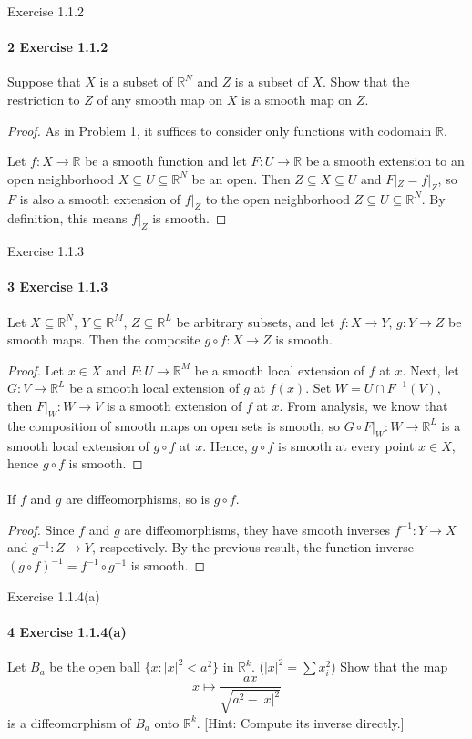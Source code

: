\documentclass[12pt]{article}
\newlength{\myparskip}
\newenvironment{fullbox}{\begin{lrbox}{\savefullbox}\begin{minipage}{\dimexpr\textwidth-2\fboxsep\relax}\setlength{\parskip}{\myparskip}}{\end{minipage}\end{lrbox}\framebox[\textwidth]{\usebox{\savefullbox}}}
\newenvironment{pbox}[1][]{\begin{fullbox}\ifx#1\empty\else\paragraph{#1}\phantom{}\fi}{\end{fullbox}}
\theoremstyle{definition}
\newcommand{\R}{\mathbb{R}}
\newcommand{\<}{\langle}
\renewcommand{\>}{\rangle}
\newcommand{\seq}{\subseteq}
\begin{document}
\newpage
\begin{pbox}[2 Exercise 1.1.2]
    Suppose that $X$ is a subset of $\R^N$ and $Z$ is a subset of $X$.
    Show that the restriction to $Z$ of any smooth map on $X$ is a smooth map on $Z$.
\end{pbox}

\begin{proof}
    As in Problem 1, it suffices to consider only functions with codomain $\R$.

    Let $f : X \to \R$ be a smooth function and let $F : U \to \R$ be a smooth extension to an open neighborhood $X \seq U \seq \R^N$ be an open.
    Then $Z \seq X \seq U$ and $F|_Z = f|_Z$, so $F$ is also a smooth extension of $f|_Z$ to the open neighborhood $Z \seq U \seq \R^N$.
    By definition, this means $f|_Z$ is smooth.
\end{proof}

\begin{pbox}[3 Exercise 1.1.3]
    Let $X \seq \R^N$, $Y \seq \R^M$, $Z \seq \R^L$ be arbitrary subsets, and let $f : X \to Y$, $g : Y \to Z$ be smooth maps.
    Then the composite $g \circ f : X \to Z$ is smooth.
\end{pbox}

\begin{proof}
    Let $x \in X$ and $F : U \to \R^M$ be a smooth local extension of $f$ at $x$.
    Next, let $G : V \to \R^L$ be a smooth local extension of $g$ at $f(x)$.
    Set $W = U \cap F^{-1}(V)$, then $F|_W : W \to V$ is a smooth extension of $f$ at $x$.
    From analysis, we know that the composition of smooth maps on open sets is smooth, so $G \circ F|_W : W \to \R^L$ is a smooth local extension of $g \circ f$ at $x$.
    Hence, $g \circ f$ is smooth at every point $x \in X$, hence $g \circ f$ is smooth.
\end{proof}


\begin{pbox}[]
    If $f$ and $g$ are diffeomorphisms, so is $g \circ f$.
\end{pbox}

\begin{proof}
    Since $f$ and $g$ are diffeomorphisms, they have smooth inverses $f^{-1} : Y \to X$ and $g^{-1} : Z \to Y$, respectively.
    By the previous result, the function inverse $(g \circ f)^{-1} = f^{-1} \circ g^{-1}$ is smooth.
\end{proof}


\begin{pbox}[4 Exercise 1.1.4(a)]
    Let $B_a$ be the open ball $\{x : |x|^2 < a^2\}$ in $\R^k$.
    ($|x|^2 = \sum x_i^2$) Show that the map
    \[
        x \longmapsto \frac{ax}{\sqrt{a^2 - |x|^2}}
    \]
    is a diffeomorphism of $B_a$ onto $\R^k$.
    [Hint: Compute its inverse directly.]
\end{pbox}
\end{document}
